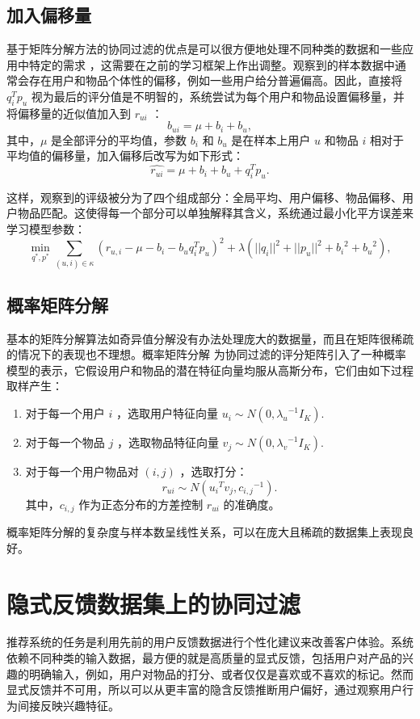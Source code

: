 \subsection{加入偏移量}
基于矩阵分解方法的协同过滤的优点是可以很方便地处理不同种类的数据和一些应用中特定的需求 \cite{Koren2009Matrix}，这需要在之前的学习框架上作出调整。观察到的样本数据中通常会存在用户和物品个体性的偏移，例如一些用户给分普遍偏高。因此，直接将 $q_i^Tp_u$ 视为最后的评分值是不明智的，系统尝试为每个用户和物品设置偏移量，并将偏移量的近似值加入到 $r_{ui}$ ：
$$
b_{ui} = \mu + b_i + b_u,
$$
其中，$\mu$ 是全部评分的平均值，参数 $b_i$ 和 $b_u$ 是在样本上用户 $u$ 和物品 $i$ 相对于平均值的偏移量，加入偏移后改写为如下形式：
$$
\hat{r_{ui}} = \mu + b_i + b_u + q_i^Tp_u.
$$

这样，观察到的评级被分为了四个组成部分：全局平均、用户偏移、物品偏移、用户物品匹配。这使得每一个部分可以单独解释其含义，系统通过最小化平方误差来学习模型参数：
$$
\min_{q^*, p^*} {\sum\limits_{(u,i) \in \kappa} {{(r_{u,i}-  \mu - b_i - b_u   q_i^Tp_u)}^2 + \lambda(||q_i||^2 + ||p_u||^2  + {b_i}^2 + {b_u}^2 )} } ,
$$

\subsection{概率矩阵分解}
基本的矩阵分解算法如奇异值分解没有办法处理庞大的数据量，而且在矩阵很稀疏的情况下的表现也不理想。概率矩阵分解\cite{Salakhutdinov2007Probabilistic} 为协同过滤的评分矩阵引入了一种概率模型的表示，它假设用户和物品的潜在特征向量均服从高斯分布，它们由如下过程取样产生：

\begin{enumerate}[itemindent=1em]
\item 对于每一个用户 $i$ ，选取用户特征向量 $ u_i \sim N(0,  {\lambda_u}^{-1}I_K). $ 
\item 对于每一个物品 $j$ ，选取物品特征向量 $v_j \sim N(0, {\lambda_v}^{-1}I_K).$
\item 对于每一个用户物品对 $(i,j)$ ，选取打分：
   $$
   r_{ui} \sim N({u_i}^Tv_j, {c_{i,j}}^{-1}).
   $$
   其中，$c_{i,j}$ 作为正态分布的方差控制 $r_{ui}$ 的准确度。
\end{enumerate}
概率矩阵分解的复杂度与样本数呈线性关系，可以在庞大且稀疏的数据集上表现良好。

\section{隐式反馈数据集上的协同过滤}
推荐系统的任务是利用先前的用户反馈数据进行个性化建议来改善客户体验。系统依赖不同种类的输入数据，最方便的就是高质量的显式反馈，包括用户对产品的兴趣的明确输入，例如，用户对物品的打分、或者仅仅是喜欢或不喜欢的标记。然而显式反馈并不可用，所以可以从更丰富的隐含反馈推断用户偏好，通过观察用户行为间接反映兴趣特征。

